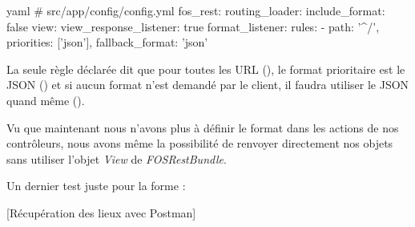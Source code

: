 \documentclass[big]{zmdocument}
\begin{document}
\begin{CodeBlock}{yaml}
# src/app/config/config.yml
fos_rest:
    routing_loader:
        include_format: false
    view:
        view_response_listener: true
    format_listener:
        rules:
            - { path: '^/', priorities: ['json'], fallback_format: 'json' }
\end{CodeBlock}



La seule règle déclarée dit que pour toutes les URL (), le format prioritaire est le JSON () et si aucun format n'est demandé par le client, il faudra utiliser le JSON quand même ().



Vu que maintenant nous n'avons plus à définir le format dans les actions de nos contrôleurs, nous avons même la possibilité de renvoyer directement nos objets sans utiliser l'objet \textit{View} de \textit{FOSRestBundle}.






Un dernier test juste pour la forme :



[Récupération des lieux avec Postman]


\end{document}
